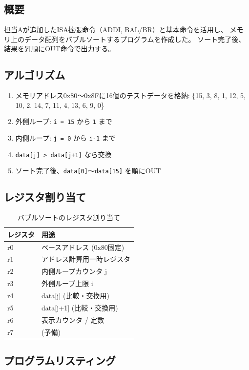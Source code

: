 \documentclass[a4paper,11pt]{ltjsarticle}
\begin{document}
\subsection{概要}

担当Aが追加したISA拡張命令（ADDI, BAL/BR）と基本命令を活用し、
メモリ上のデータ配列をバブルソートするプログラムを作成した。
ソート完了後、結果を昇順にOUT命令で出力する。

\subsection{アルゴリズム}

\begin{enumerate}
\item メモリアドレス0x80〜0x8Fに16個のテストデータを格納:
      \{15, 3, 8, 1, 12, 5, 10, 2, 14, 7, 11, 4, 13, 6, 9, 0\}
\item 外側ループ: \texttt{i = 15} から \texttt{1} まで
\item 内側ループ: \texttt{j = 0} から \texttt{i-1} まで
\item \texttt{data[j] > data[j+1]} なら交換
\item ソート完了後、\texttt{data[0]}〜\texttt{data[15]} を順にOUT
\end{enumerate}

\subsection{レジスタ割り当て}

\begin{table}[h]
\centering
\caption{バブルソートのレジスタ割り当て}
\begin{tabular}{ll}
\toprule
レジスタ & 用途 \\
\midrule
r0 & ベースアドレス (0x80固定) \\
r1 & アドレス計算用一時レジスタ \\
r2 & 内側ループカウンタ j \\
r3 & 外側ループ上限 i \\
r4 & data[j] (比較・交換用) \\
r5 & data[j+1] (比較・交換用) \\
r6 & 表示カウンタ / 定数 \\
r7 & (予備) \\
\bottomrule
\end{tabular}
\end{table}

\subsection{プログラムリスティング}
\end{document}
